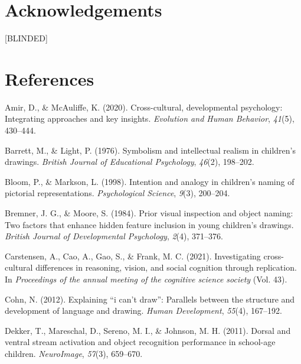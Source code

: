 \documentclass[
  english,
  man]{apa6}
\begin{document}
\hypertarget{acknowledgements}{%
\section{Acknowledgements}\label{acknowledgements}}

{[}BLINDED{]}

\newpage

\hypertarget{references}{%
\section{References}\label{references}}

\begingroup
\setlength{\parindent}{-0.5in}
\setlength{\leftskip}{0.5in}

\hypertarget{refs}{}
\leavevmode\hypertarget{ref-amir2020cross}{}%
Amir, D., \& McAuliffe, K. (2020). Cross-cultural, developmental psychology: Integrating approaches and key insights. \emph{Evolution and Human Behavior}, \emph{41}(5), 430--444.

\leavevmode\hypertarget{ref-barrett1976symbolism}{}%
Barrett, M., \& Light, P. (1976). Symbolism and intellectual realism in children's drawings. \emph{British Journal of Educational Psychology}, \emph{46}(2), 198--202.

\leavevmode\hypertarget{ref-bloom1998intention}{}%
Bloom, P., \& Markson, L. (1998). Intention and analogy in children's naming of pictorial representations. \emph{Psychological Science}, \emph{9}(3), 200--204.

\leavevmode\hypertarget{ref-bremmer1984prior}{}%
Bremner, J. G., \& Moore, S. (1984). Prior visual inspection and object naming: Two factors that enhance hidden feature inclusion in young children's drawings. \emph{British Journal of Developmental Psychology}, \emph{2}(4), 371--376.

\leavevmode\hypertarget{ref-carstensen2021investigating}{}%
Carstensen, A., Cao, A., Gao, S., \& Frank, M. C. (2021). Investigating cross-cultural differences in reasoning, vision, and social cognition through replication. In \emph{Proceedings of the annual meeting of the cognitive science society} (Vol. 43).

\leavevmode\hypertarget{ref-cohn2012explaining}{}%
Cohn, N. (2012). Explaining ``i can't draw'': Parallels between the structure and development of language and drawing. \emph{Human Development}, \emph{55}(4), 167--192.

\leavevmode\hypertarget{ref-dekker2011dorsal}{}%
Dekker, T., Mareschal, D., Sereno, M. I., \& Johnson, M. H. (2011). Dorsal and ventral stream activation and object recognition performance in school-age children. \emph{NeuroImage}, \emph{57}(3), 659--670.
\end{document}
